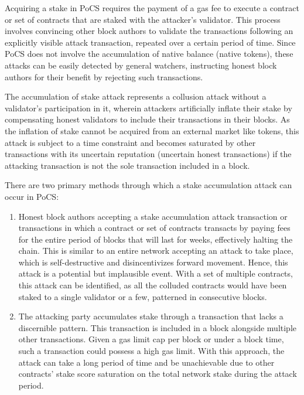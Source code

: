 \documentclass{article}
\begin{document}
Acquiring a stake in PoCS requires the payment of a gas fee to execute a contract or set of contracts that are staked with the attacker's validator. This process involves convincing other block authors to validate the transactions following an explicitly visible attack transaction, repeated over a certain period of time. Since PoCS does not involve the accumulation of native balance (native tokens), these attacks can be easily detected by general watchers, instructing honest block authors for their benefit by rejecting such transactions.

The accumulation of stake attack represents a collusion attack without a validator's participation in it, wherein attackers artificially inflate their stake by compensating honest validators to include their transactions in their blocks. As the inflation of stake cannot be acquired from an external market like tokens, this attack is subject to a time constraint and becomes saturated by other transactions with its uncertain reputation (uncertain honest transactions) if the attacking transaction is not the sole transaction included in a block.

There are two primary methods through which a stake accumulation attack can occur in PoCS:

\begin{enumerate}
    \item Honest block authors accepting a stake accumulation attack transaction or transactions in which a contract or set of contracts transacts by paying fees for the entire period of blocks that will last for weeks, effectively halting the chain. This is similar to an entire network accepting an attack to take place, which is self-destructive and disincentivizes forward movement. Hence, this attack is a potential but implausible event. With a set of multiple contracts, this attack can be identified, as all the colluded contracts would have been staked to a single validator or a few, patterned in consecutive blocks.
    \item The attacking party accumulates stake through a transaction that lacks a discernible pattern. This transaction is included in a block alongside multiple other transactions. Given a gas limit cap per block or under a block time, such a transaction could possess a high gas limit. With this approach, the attack can take a long period of time and be unachievable due to other contracts' stake score saturation on the total network stake during the attack period.
\end{enumerate}
\end{document}
